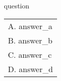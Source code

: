 \begin{question}
    {{ question }}

    \begin{tabular}{ m{\linewidth}}
        A. {{ answer_a }}
        \\
        B. {{ answer_b }}
        \\
        C. {{ answer_c }}
        \\
        D. {{ answer_d }}
        \\
    \end{tabular}
\end{question}
